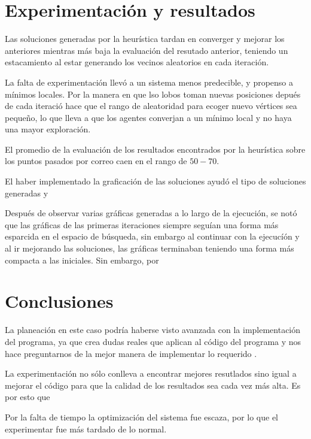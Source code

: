 \documentclass[a4paper]{article}
\begin{document}
\section*{Experimentaci\'on y resultados}

Las soluciones generadas por la heur\'istica tardan en converger y mejorar los anteriores mientras
m\'as baja la evaluaci\'on del resutado anterior, teniendo un estacamiento al estar generando los
vecinos aleatorios en cada iteraci\'on.



La falta de experimentaci\'on llev\'o a un sistema menos predecible, y propenso a m\'inimos locales.
Por la manera en que lso lobos toman nuevas posiciones depu\'es de cada iteraci\'o hace que el rango de aleatoridad para ecoger nuevo v\'ertices sea pequeño, lo que lleva a que los agentes converjan a
un m\'inimo local y no haya una mayor exploraci\'on.

El promedio de la evaluaci\'on de los resultados encontrados por la heur\'istica sobre los puntos pasados por correo caen en el rango de $50 - 70$. 

El haber implementado la graficaci\'on de las soluciones ayud\'o el tipo de soluciones generadas y 


 Despu\'es de observar varias gr\'aficas generadas a lo largo de la ejecuci\'on, se not\'o que las gr\'aficas de las primeras iteraciones siempre segu\'ian una forma m\'as esparcida
en el espacio de b\'usqueda, sin embargo al continuar con la ejecuc\'i\'on y al ir mejorando las
soluciones, las gr\'aficas terminaban teniendo una forma m\'as compacta a las iniciales. Sin embargo, por 

\section*{Conclusiones}
La planeaci\'on en este caso podr\'ia haberse visto avanzada con la implementaci\'on del programa,
ya que crea dudas reales que aplican al c\'odigo del programa y nos hace preguntarnos de la mejor
manera de implementar lo requerido .

La experimentaci\'on no s\'olo conlleva a encontrar mejores resutlados sino igual a mejorar el
c\'odigo para que la calidad de los resultados sea cada vez m\'as alta. Es por esto que

Por la falta de tiempo la optimización del sistema fue escaza, por lo que el experimentar fue m\'as
tardado de lo normal.


{}

\end{document}
